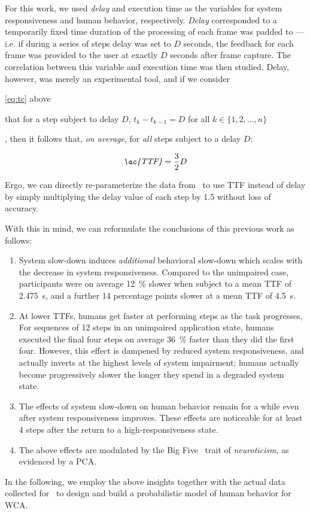 For this work, we used \emph{delay} and execution time as the variables for system responsiveness and human behavior, respectively.
\emph{Delay} corresponded to a temporarily fixed time duration of the processing of each frame was padded to --- i.e. if during a series of steps delay was set to \( D \) seconds, the feedback for each frame was provided to the user at exactly \( D \) seconds after frame capture.
The correlation between this variable and execution time was then studied.
Delay, however, was merely an experimental tool, and if we consider
\begin{enumerate*}[itemjoin={{; }}, itemjoin={{; and }}]
    \item \cref{eq:tc} above
    \item that for a step subject to delay \( D \), \( t_k - t_{k - 1} = D \) for all \( k \in \{1, 2, \ldots, n\} \)
\end{enumerate*},
then it follows that, \emph{on average}, for \emph{all} steps subject to a delay \( D \):

\begin{align}\label{eq:ttf}
    \text{\emph{\ac{TTF}}} = \frac{3}{2}D
\end{align}

Ergo, we can directly re-parameterize the data from~\cite{olguinmunoz:impact2021} to use \ac{TTF} instead of delay by simply multiplying the delay value of each step by \num{1.5} without loss of accuracy.

With this in mind, we can reformulate the conclusions of this previous work as follows:
\begin{enumerate}
    \item System slow-down induces \emph{additional} behavioral slow-down which scales with the decrease in system responsiveness.
    Compared to the unimpaired case, participants were on average \SI{12}{\percent} slower when subject to a mean \ac{TTF} of \SI{2.475}{\second}, and a further \num{14} percentage points slower at a mean \ac{TTF} of \SI{4.5}{\second}.

    \item\label{item:speedup} At lower \acp{TTF}, humans get faster at performing steps as the task progresses, 
    For sequences of \num{12} steps in an unimpaired application state, humans executed the final four steps on average \SI{36}{\percent} faster than they did the first four.
    However, this effect is dampened by reduced system responsiveness, and actually inverts at the highest levels of system impairment; humans actually become progressively slower the longer they spend in a degraded system state.

    \item\label{item:remain} The effects of system slow-down on human behavior remain for a while even after system responsiveness improves.
    These effects are noticeable for at least \num{4} steps after the return to a high-responsiveness state. 
    
    \item The above effects are modulated by the Big Five~\cite{oliver:bfi1999} trait of \emph{neuroticism}, as evidenced by a \ac{PCA}.
\end{enumerate}

In the following, we employ the above insights together with the actual data collected for~\cite{olguinmunoz:impact2021} to design and build a probabilistic model of human behavior for \ac{WCA}.

